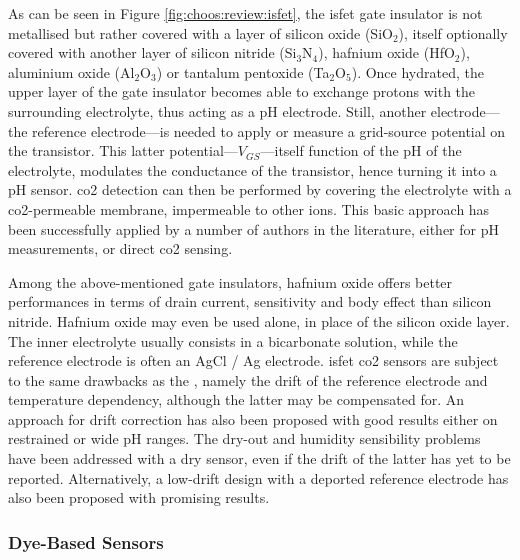 As can be seen in Figure \ref{fig:choos:review:isfet}, the \gls{isfet} gate insulator is not metallised but rather covered with a layer of silicon oxide (SiO$_2$), itself optionally covered with another layer of silicon nitride (Si$_3$N$_4$), hafnium oxide (HfO$_2$), aluminium oxide (Al$_2$O$_3$) or tantalum pentoxide (Ta$_2$O$_5$). Once hydrated, the upper layer of the gate insulator becomes able to exchange protons with the surrounding electrolyte, thus acting as a pH electrode. Still, another electrode---the reference electrode---is needed to apply or measure a grid-source potential on the transistor. This latter potential---$V_{GS}$---itself function of the pH of the electrolyte, modulates the conductance of the transistor, hence turning it into a pH sensor\cite{bergveld1981}. \gls{co2} detection can then be performed by covering the electrolyte with a \gls{co2}-permeable membrane, impermeable to other ions. This basic approach has been successfully applied by a number of authors in the literature, either for pH measurements\cite{hu1989, jamasb2019}, or direct \gls{co2} sensing\cite{star2004, mohri2006, shitashima2010, ekwinska2012}.

Among the above-mentioned gate insulators, hafnium oxide offers better performances in terms of drain current, sensitivity and body effect than silicon nitride. Hafnium oxide may even be used alone, in place of the silicon oxide layer\cite{lai2010}. The inner electrolyte usually consists in a bicarbonate solution, while the reference electrode is often an AgCl / Ag electrode. \gls{isfet} \gls{co2} sensors are subject to the same drawbacks as the \ssel, namely the drift of the reference electrode and temperature dependency, although the latter may be compensated for. An approach for drift correction has also been proposed with good results either on restrained\cite{jamasb2019} or wide pH ranges\cite{sinha2020}. The dry-out and humidity sensibility problems have been addressed with a dry sensor\cite{shimanoe2004}, even if the drift of the latter has yet to be reported. Alternatively, a low-drift design with a deported reference electrode has also been proposed with promising results\cite{hsieh2014}.

\subsubsection{Dye-Based Sensors}\label{subsect:choos:review:dye_based}

